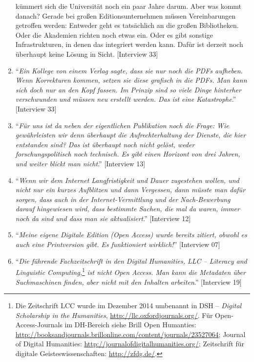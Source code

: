 \documentclass[a4paper,
fontsize=11pt,
oneside,
numbers=noperiodatend,
parskip=half-,
bibliography=totoc,
final
]{scrartcl}
\begin{document}
\begin{enumerate}
{{  kümmert sich die Universität noch ein paar Jahre darum. Aber was kommt
  danach? Gerade bei großen Editionsunternehmen müssen Vereinbarungen
  getroffen werden: Entweder geht es tatsächlich an die großen
  Bibliotheken. Oder die Akademien richten noch etwas ein. Oder es gibt
  sonstige Infrastrukturen, in denen das integriert werden kann. Dafür
  ist derzeit noch überhaupt keine Lösung in Sicht}.} {[}Interview 33{]}
\item
  \enquote{\emph{Ein Kollege von einem Verlag sagte, dass sie nur noch
  die PDFs aufheben. Wenn Korrekturen kommen, setzen sie diese grafisch
  in die PDFs. Man kann sich doch nur an den Kopf fassen. Im Prinzip
  sind so viele Dinge hinterher verschwunden und müssen neu erstellt
  werden. Das ist eine Katastrophe}.} {[}Interview 33{]}
\item
  \enquote{\emph{Für uns ist da neben der eigentlichen Publikation noch
  die Frage: Wie gewährleisten wir denn überhaupt die Aufrechterhaltung
  der Dienste, die hier entstanden sind? Das ist überhaupt noch nicht
  gelöst, weder forschungspolitisch noch technisch. Es gibt einen
  Horizont von drei Jahren, und weiter blickt man nicht}.} {[}Interview
  13{]}
\item
  \enquote{\emph{Wenn wir dem Internet Langfristigkeit und Dauer
  zugestehen wollen, und nicht nur ein kurzes Aufblitzen und dann
  Vergessen, dann müsste man dafür sorgen, dass auch in der
  Internet-Vermittlung und der Nach-Bewerbung darauf hingewiesen wird,
  dass bestimmte Sachen, die mal da waren, immer noch da sind und dass
  man sie aktualisiert}.} {[}Interview 12{]}
\item
  \enquote{\emph{Meine eigene Digitale Edition (Open Access) wurde
  bereits zitiert, obwohl es auch eine Printversion gibt. Es
  funktioniert wirklich!}} {[}Interview 07{]}
\item
  \enquote{\emph{Die führende Fachzeitschrift in den Digital Humanities,
  LLC -- Literacy and Linguistic Computing,}\footnote{Die Zeitschrift
    LCC wurde im Dezember 2014 umbenannt in DSH -- \emph{Digital
    Scholarship in the Humanities},
    \url{http://llc.oxfordjournals.org/}. Für Open-Access-Journals im
    DH-Bereich siehe Brill Open Humanties:
    \url{http://booksandjournals.brillonline.com/content/journals/23527064};
    Journal of Digital Humanities:
    \url{http://journalofdigitalhumanities.org/}; Zeitschrift für
    digitale Geisteswissenschaften: \url{http://zfdg.de/}.} \emph{ist
  nicht Open Access. Man kann die Metadaten über Suchmaschinen finden,
  aber nicht mit den Inhalten arbeiten}.} {[}Interview 19{]}

\end{enumerate}
\end{document}
